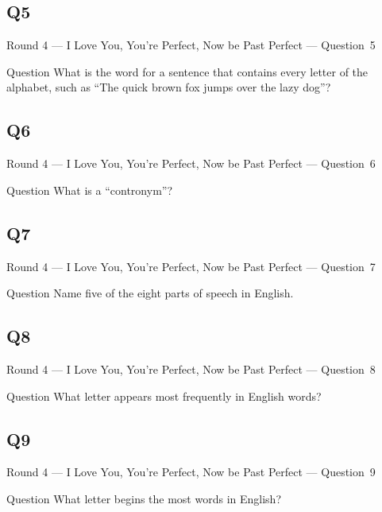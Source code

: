\documentclass[11pt]{beamer}
\begin{document}
\subsection*{Q5}
\begin{frame}[t]{Round 4 --- I Love You, You're Perfect, Now be Past Perfect --- \mbox{Question 5}}
\vspace{-0.5em}
\begin{block}{Question}
What is the word for a sentence that contains every letter of the alphabet, such as ``The quick brown fox jumps over the lazy dog''?
\end{block}
\end{frame}
\subsection*{Q6}
\begin{frame}[t]{Round 4 --- I Love You, You're Perfect, Now be Past Perfect --- \mbox{Question 6}}
\vspace{-0.5em}
\begin{block}{Question}
What is a ``contronym''?
\end{block}
\end{frame}
\subsection*{Q7}
\begin{frame}[t]{Round 4 --- I Love You, You're Perfect, Now be Past Perfect --- \mbox{Question 7}}
\vspace{-0.5em}
\begin{block}{Question}
Name five of the eight parts of speech in English.
\end{block}
\end{frame}
\subsection*{Q8}
\begin{frame}[t]{Round 4 --- I Love You, You're Perfect, Now be Past Perfect --- \mbox{Question 8}}
\vspace{-0.5em}
\begin{block}{Question}
What letter appears most frequently in English words?
\end{block}
\end{frame}
\subsection*{Q9}
\begin{frame}[t]{Round 4 --- I Love You, You're Perfect, Now be Past Perfect --- \mbox{Question 9}}
\vspace{-0.5em}
\begin{block}{Question}
What letter begins the most words in English?
\end{block}
\end{frame}
\end{document}
